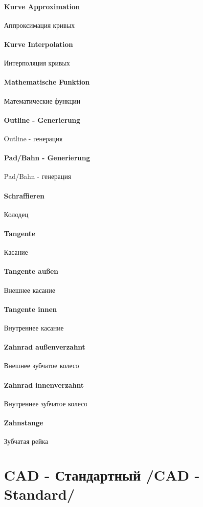 \documentclass[14pt,a4paper]{book}
\newcommand{\TRsubsection}[2]{\chapter{#2 /#1/}}
\begin{document}
			\subsubsection{Kurve Approximation}{Аппроксимация кривых}
			\subsubsection{Kurve Interpolation}{Интерполяция кривых}
			\subsubsection{Mathematische Funktion}{Математические функции}
			\subsubsection{Outline - Generierung}{Outline - генерация}
			\subsubsection{Pad/Bahn - Generierung}{Pad/Bahn - генерация}
			\subsubsection{Schraffieren}{Колодец}
			\subsubsection{Tangente}{Касание}
			\subsubsection{Tangente außen}{Внешнее касание}
			\subsubsection{Tangente innen}{Внутреннее касание}
			\subsubsection{Zahnrad außenverzahnt}{Внешнее зубчатое колесо}
			\subsubsection{Zahnrad innenverzahnt}{Внутреннее зубчатое колесо}
			\subsubsection{Zahnstange}{Зубчатая рейка}
		\TRsubsection{CAD - Standard}{CAD - Стандартный}
\end{document}

